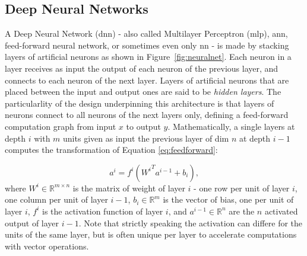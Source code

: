 \subsection{Deep Neural Networks}
A Deep Neural Network (\gls{dnn}) - also called Multilayer Perceptron (\gls{mlp}), \gls{ann}, feed-forward neural network, or sometimes even only \gls{nn} - is made by stacking layers of artificial neurons as shown in Figure~\ref{fig:neuralnet}. Each neuron in a layer receives as input the output of each neuron of the previous layer, and connects to each neuron of the next layer. Layers of artificial neurons that are placed between the input and output ones are said to be \textit{hidden layers}. The particularlity of the design underpinning this architecture is that layers of neurons connect to all neurons of the next layers only, defining a feed-forward computation graph from input $x$ to output $y$. Mathematically, a single layers at depth $i$ with $m$ units given as input the previous layer of dim $n$ at depth $i-1$ computes the  transformation of Equation \ref{eq:feedforward}:

\begin{equation}\label{eq:feedforward}
    a^i = f^i\left({W^i}^T a^{i-1} + b_i\right),
\end{equation}
where $W^i \in \mathbb{R}^{m \times n}$ is the matrix of weight of layer $i$ - one row per unit of layer $i$, one column per unit of layer $i-1$, $b_i \in \mathbb{R}^m$ is the vector of bias, one per unit of layer $i$, $f^i$ is the activation function of layer $i$, and $a^{i-1} \in \mathbb{R}^n$ are the $n$ activated output of layer $i-1$. Note that strictly speaking the activation can differe for the units of the same layer, but is often unique per layer to accelerate computations with vector operations.

